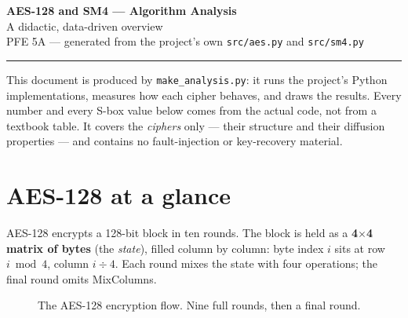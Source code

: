 \documentclass[11pt,a4paper]{article}
\begin{document}
\begin{center}
  {\LARGE\bfseries AES-128 and SM4 --- Algorithm Analysis}\\[2pt]
  {\large A didactic, data-driven overview}\\[4pt]
  {\footnotesize PFE 5A --- generated from the project's own \texttt{src/aes.py} and \texttt{src/sm4.py}}
\end{center}
\vspace{4pt}
\hrule
\vspace{10pt}

This document is produced by \texttt{make\_analysis.py}: it runs the project's
Python implementations, measures how each cipher behaves, and draws the results.
Every number and every S-box value below comes from the actual code, not from a
textbook table. It covers the \emph{ciphers} only --- their structure and their
diffusion properties --- and contains no fault-injection or key-recovery material.

\section{AES-128 at a glance}

AES-128 encrypts a 128-bit block in ten rounds. The block is held as a
\textbf{4$\times$4 matrix of bytes} (the \emph{state}), filled column by column:
byte index $i$ sits at row $i \bmod 4$, column $i \div 4$. Each round mixes the
state with four operations; the final round omits MixColumns.

\begin{figure}[H]\centering
{}
\caption{The AES-128 encryption flow. Nine full rounds, then a final round.}
\end{figure}
\end{document}
